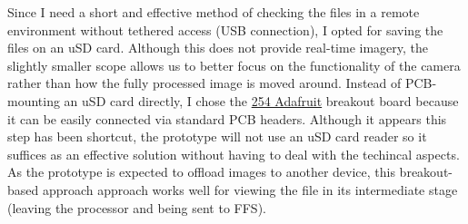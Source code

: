 Since I need a short and effective method of checking the files in a remote environment without tethered access (USB connection), I opted for saving the files on an uSD card. Although this does not provide real-time imagery, the slightly smaller scope allows us to better focus on the functionality of the camera rather than how the fully processed image is moved around.
\nl
Instead of PCB-mounting an uSD card directly, I chose the \href{https://au.mouser.com/ProductDetail/Adafruit/254?qs=GURawfaeGuAkwqCF4BmPzA%3D%3D&srsltid=AfmBOoqN0VaaHsFOYARHTvz8zYqY9TRrMM7HXF_dcSo8h28U_mns63k3}{254 Adafruit} breakout board because it can be easily connected via standard PCB headers. Although it appears this step has been shortcut, the prototype will not use an uSD card reader so it suffices as an effective solution without having to deal with the techincal aspects.
As the prototype is expected to offload images to another device, this breakout-based approach approach works well for viewing the file in its intermediate stage (leaving the processor and being sent to FFS).
